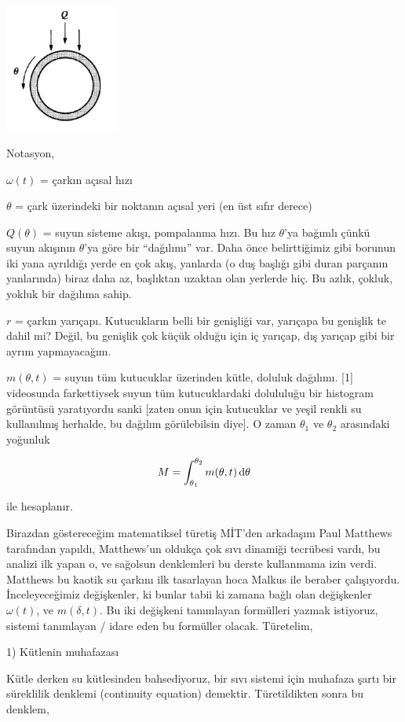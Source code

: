 \documentclass[12pt,fleqn]{article}\usepackage{../../common}
\begin{document}
\includegraphics[width=10em]{15_02.png}

Notasyon,

$\omega(t)$ = çarkın açısal hızı

$\theta$ = çark üzerindeki bir noktanın açısal yeri (en üst sıfır derece)

$Q(\theta)$ = suyun sisteme akışı, pompalanma hızı. Bu hız $\theta$'ya
bağımlı çünkü suyun akışının $\theta$'ya göre bir ``dağılımı'' var. Daha
önce belirttiğimiz gibi borunun iki yana ayrıldığı yerde en çok akış,
yanlarda (o duş başlığı gibi duran parçanın yanlarında) biraz daha az,
başlıktan uzaktan olan yerlerde hiç. Bu azlık, çokluk, yokluk bir dağılıma
sahip.

$r$ = çarkın yarıçapı. Kutucukların belli bir genişliği var, yarıçapa bu
genişlik te dahil mi? Değil, bu genişlik çok küçük olduğu için iç yarıçap,
dış yarıçap gibi bir ayrım yapmayacağım.

$m(\theta, t)$ = suyun tüm kutucuklar üzerinden kütle, doluluk
dağılımı. [1] videosunda farkettiysek suyun tüm kutucuklardaki dolululuğu
bir histogram görüntüsü yaratıyordu sanki [zaten onun için kutucuklar ve
yeşil renkli su kullanılmış herhalde, bu dağılım görülebilsin diye]. O
zaman $\theta_1$ ve $\theta_2$ arasındaki yoğunluk

$$ M = \int_{\theta_1}^{\theta_2} m(\theta, t) \,\mathrm{d}\theta $$

ile hesaplanır. 

Birazdan göstereceğim matematiksel türetiş MİT'den arkadaşım Paul Matthews
tarafından yapıldı, Matthews'un oldukça çok sıvı dinamiği tecrübesi vardı,
bu analizi ilk yapan o, ve sağolsun denklemleri bu derste kullanmama izin
verdi. Matthews bu kaotik su çarkını ilk tasarlayan hoca Malkus ile beraber
çalışıyordu. İnceleyeceğimiz değişkenler, ki bunlar tabii ki zamana bağlı olan
değişkenler $\omega(t)$, ve $m(\delta,t)$. Bu iki değişkeni tanımlayan
formülleri yazmak istiyoruz, sistemi tanımlayan / idare eden bu formüller
olacak. Türetelim, 

1) Kütlenin muhafazası

Kütle derken su kütlesinden bahsediyoruz, bir sıvı sistemi için muhafaza
şartı bir süreklilik denklemi (continuity equation) demektir. Türetildikten
sonra bu denklem,
\end{document}
